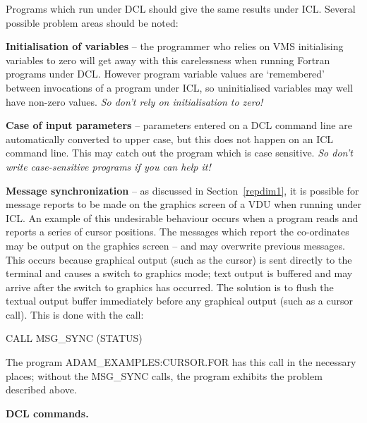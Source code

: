 \documentclass[twoside,11pt,nolof]{starlink}
\begin{document}
Programs which run under DCL should give the same results under ICL.
Several possible problem areas should be noted:
\begin{description}
\item\textbf{Initialisation of variables} -- the programmer
who relies on VMS initialising variables to zero will get away with this
carelessness when running Fortran programs under DCL.
However program variable values are `remembered' between invocations
of a program under ICL, so uninitialised variables may well have
non-zero values. {\sl So don't rely on initialisation to zero!}

\item\textbf{Case of input parameters} -- parameters entered on a DCL
command line are automatically converted to upper case, but this does not
happen on an ICL command line. This may catch out the program which is
case sensitive. {\sl So don't write case-sensitive programs if you can help
it!}

\item\textbf{Message synchronization} -- as discussed in Section~\ref{repdim1},
it is possible for message reports to be
made on the graphics screen of a VDU when running under ICL.
An example of this undesirable behaviour occurs when a program reads
and reports a series of cursor positions.
The messages which report the co-ordinates may be output on the graphics
screen -- and may overwrite previous messages.
This occurs because graphical output (such as the cursor) is sent directly
to the terminal and causes a switch to graphics mode; text output is
buffered and may arrive after the switch to graphics has occurred.
The solution is to flush  the textual output buffer immediately before any
graphical output (such as a cursor call).
This is done with the call:
\begin{terminalv}
      CALL MSG_SYNC (STATUS)
\end{terminalv}
The program ADAM\_EXAMPLES:CURSOR.FOR has this call in the necessary places;
without the MSG\_SYNC calls, the program exhibits the problem described
above.
\end{description}

{\bigskip\large\bf DCL commands.}
\end{document}
